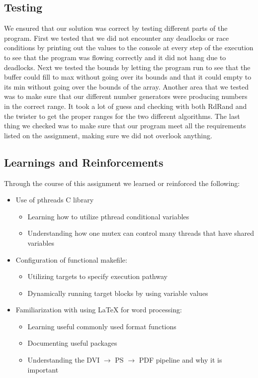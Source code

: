 \documentclass[letterpaper,10pt]{article}
\begin{document}
\subsection{Testing}
We ensured that our solution was correct by testing different parts of the program. First we tested that we did not encounter any deadlocks or race conditions by printing out the values to the console at every step of the execution to see that the program was flowing correctly and it did not hang due to deadlocks. Next we tested the bounds by letting the program run to see that the buffer could fill to max without going over its bounds and that it could empty to its min without going over the bounds of the array. Another area that we tested was to make sure that our different number generators were producing numbers in the correct range. It took a lot of guess and checking with both RdRand and the twister to get the proper ranges for the two different algorithms. The last thing we checked was to make sure that our program meet all the requirements listed on the assignment, making sure we did not overlook anything.

\subsection{Learnings and Reinforcements}
Through the course of this assignment we learned or reinforced the following:
\begin{itemize}
  \item Use of pthreads C library
    \begin{itemize}
      \item Learning how to utilize pthread conditional variables
        \item Understanding how one mutex can control many threads that have shared variables
    \end{itemize}
    \item Configuration of functional makefile:
    \begin{itemize}
      \item Utilizing targets to specify execution pathway
        \item Dynamically running target blocks by using variable values 
    \end{itemize}
    \item Familiarization with using \LaTeX{} for word processing:
    \begin{itemize}
      \item Learning useful commonly used format functions
        \item Documenting useful packages
        \item Understanding the DVI $\rightarrow$ PS $\rightarrow$ PDF pipeline and why it is important
    \end{itemize}
\end{itemize}
\end{document}
